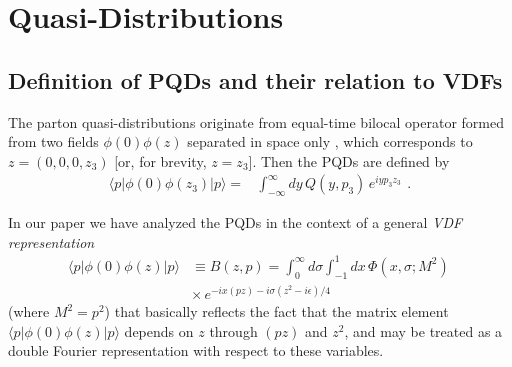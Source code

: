 \documentclass[final,5p,times,twocolumn]{elsarticle}
\begin{document}
 
 

 
  
 \setcounter{equation}{0}   



  
\section{Quasi-Distributions} 

\subsection{Definition of PQDs and their  relation to VDFs} 

The   parton quasi-distributions originate from  equal-time bilocal operator 
formed from two fields  $\phi(0) \phi (z)$ separated  in space only   \cite{Ji:2013dva}, which 
corresponds  to 
$z= (0,0,0,z_3)$ [or, for brevity, \mbox{$z=z_3$}]. Then the PQDs 
  are defined  by 
 \begin{align}
  \langle p |   \phi(0) \phi (z_3)|p \rangle %
=  & 
\int_{-\infty}^{\infty}   dy \, 
 Q(y, p_3) \,  e^{i y  p_3 z_3 } \, 
 \ . 
 \label{newVDFxzQ}
\end{align} 


In our paper 
\cite{Radyushkin:2016hsy} 
we have analyzed the PQDs in the context of a general
 {\it VDF representation}   \cite{Radyushkin:2014vla,Radyushkin:2015gpa} 
 \begin{align}
 \nonumber 
  \langle p |   \phi(0) \phi (z)|p \rangle & \equiv B(z,p)
=   
\int_{0}^{\infty} d \sigma \int_{-1}^1 dx\,  %
 \Phi (x,\sigma; M^2) \, \\ & \times \,  e^{-i x (pz) -i \sigma {(z^2-i \epsilon )}/{4}} \,  
 \
 \label{newVDFx}
\end{align} 
(where $M^2=p^2$)  that  basically reflects the fact that the matrix element 
$\langle p |   \phi(0) \phi (z)|p \rangle$  depends on $z$ through 
$(pz)$ and $z^2$, and may be treated as a double Fourier representation 
with respect to these variables.
\end{document}
